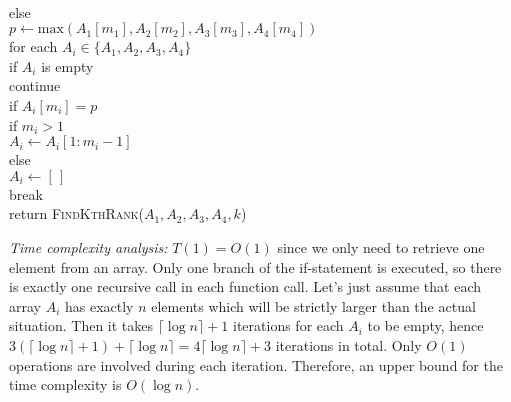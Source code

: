 \documentclass[11pt]{article}
\begin{document}
\begin{solution}
\begin{algo}
\\	else\+
\\	$p\gets \text{max}(A_1[m_1], A_2[m_2], A_3[m_3], A_4[m_4])$
\\	for each $A_i\in \{A_1, A_2, A_3, A_4\}$\+
\\	if $A_i$ is empty\+
\\	continue\-
\\	if $A_i[m_i]=p$\+
\\	if $m_i>1$\+
\\	$A_i\gets A_i[1:m_i-1]$\-
\\	else\+
\\	$A_i\gets [\,]$\-
\\ 	break\-\-
\\	return \textsc{FindKthRank($A_1, A_2, A_3, A_4, k$)}\-
\end{algo}
\emph{Time complexity analysis: }$T(1)=O(1)$ since we only need to retrieve one element from an array. Only one branch of the if-statement is executed, so there is exactly one recursive call in each function call. Let's just assume that each array $A_i$ has exactly $n$ elements which will be strictly larger than the actual situation. Then it takes $\lceil \log{n} \rceil+1$ iterations for each $A_i$ to be empty, hence $3(\lceil \log{n} \rceil+1) + \lceil \log{n} \rceil = 4\lceil \log{n} \rceil + 3$ iterations in total. Only $O(1)$ operations are involved during each iteration. Therefore, an upper bound for the time complexity is $O(\log{n})$.
\begin{equation*}
\end{equation*}
\end{solution}
\end{document}
